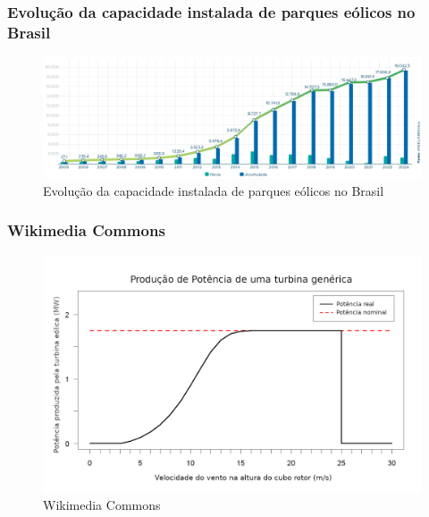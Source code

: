 \documentclass{beamer}
\begin{document}
\begin{frame}
	\frametitle{Evolução da capacidade instalada de parques eólicos no Brasil}
	\begin{figure}
		\centering
		\includegraphics[width=\textwidth]{abe_evolucao_capacidade_instalada}
		\caption{Evolução da capacidade instalada de parques eólicos no Brasil}
	\end{figure}
\end{frame}

\begin{frame}
	\frametitle{Wikimedia Commons}
	\begin{figure}
		\centering
		\includegraphics[width=\textwidth]{powercurve}
		\caption{Wikimedia Commons}
	\end{figure}
\end{frame}
\end{document}
